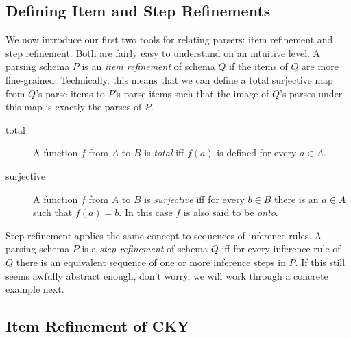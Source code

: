 \subsection{Defining Item and Step Refinements}
We now introduce our first two tools for relating parsers: item refinement and step refinement.
Both are fairly easy to understand on an intuitive level.
A parsing schema $P$ is an \emph{item refinement} of schema $Q$ if the items of $Q$ are more fine-grained.
Technically, this means that we can define a total surjective map from $Q$'s parse items to $P$'s parse items such that the image of $Q$'s parses under this map is exactly the parses of $P$.
%
\begin{description}
    \item[total] A function $f$ from $A$ to $B$ is \emph{total} iff $f(a)$ is defined for every $a \in A$.
    \item[surjective]  A function $f$ from $A$ to $B$ is \emph{surjective} iff for every $b \in B$ there is an $a \in A$ such that $f(a) = b$.
                In this case $f$ is also said to be \emph{onto}.
\end{description}
%
Step refinement applies the same concept to sequences of inference rules.
A parsing schema $P$ is a \emph{step refinement} of schema $Q$ iff for every inference rule of $Q$ there is an equivalent sequence of one or more inference steps in $P$. 
If this still seems awfully abstract enough, don't worry, we will work through a concrete example next.

\subsection{Item Refinement of CKY}

